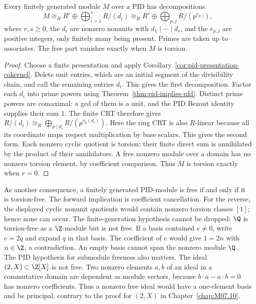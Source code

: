 \begin{theorem}\label{thm:pid-structure-existence}
Every finitely generated module $M$ over a PID has decompositions
\[
 M\cong_R R^r\oplus\bigoplus_{i=1}^s R/(d_i)
 \cong_R R^r\oplus\bigoplus_{p,j}R/(p^{e_{p,j}}),
\]
where $r,s\ge0$, the $d_i$ are nonzero nonunits with
$d_1\mid\cdots\mid d_s$, and the $e_{p,j}$ are positive integers,
only finitely many being present. Primes are taken up to associates.
The free part vanishes exactly when $M$ is torsion.
\end{theorem}
\begin{proof}
Choose a finite presentation and apply
Corollary~\ref{cor:pid-presentation-cokernel}. Delete unit entries, which
are an initial segment of the divisibility chain, and call the remaining
entries $d_i$. This gives the first decomposition.
Factor each $d_i$ into prime powers using
Theorem~\ref{thm:pid-implies-ufd}.
Distinct prime powers are comaximal: a gcd of them is a unit, and the
PID Bezout identity supplies their sum $1$.
The finite CRT therefore gives
$R/(d_i)\cong_R\bigoplus_{p\mid d_i}R/(p^{v_p(d_i)})$.
Here the ring CRT is also $R$-linear because all its coordinate maps
respect multiplication by base scalars. This gives the second form.
Each nonzero cyclic quotient is torsion; their finite direct sum is
annihilated by the product of their annihilators. A free nonzero module
over a domain has no nonzero torsion element, by coefficient comparison.
Thus $M$ is torsion exactly when $r=0$.
\end{proof}
As another consequence, a finitely generated PID-module is free if and
only if it is torsion-free. The forward implication is coefficient
cancellation. For the reverse, the displayed cyclic nonunit quotients
would contain nonzero torsion classes $[1]$; hence none can occur.
The finite-generation hypothesis cannot be dropped: $\Q$ is
torsion-free as a $\Z$-module but is not free. If a basis contained
$e\ne0$, write $e=2q$ and expand $q$ in that basis. The coefficient
of $e$ would give $1=2n$ with $n\in\Z$, a contradiction. An empty
basis cannot span the nonzero module $\Q$.
The PID hypothesis for submodule freeness also matters.
The ideal $(2,X)\subset\Z[X]$ is not free. Two nonzero elements
$a,b$ of an ideal in a commutative domain are dependent as module
vectors, because $b\cdot a-a\cdot b=0$ has nonzero coefficients.
Thus a nonzero free ideal would have a one-element basis and be
principal, contrary to the proof for $(2,X)$ in
Chapter~\ref{chap:M07.10}.

